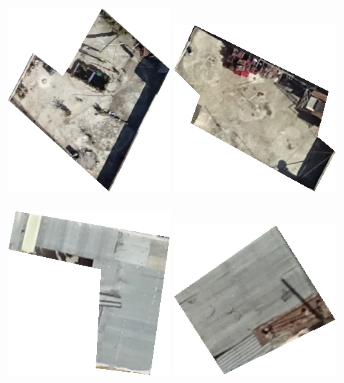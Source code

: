 \documentclass[11pt]{article}
\begin{document}
	\begin{figure}
		
		\centering
		\begin{subfigure}[c]{0.32\textwidth}
			\includegraphics[width=0.47\textwidth]{figures/mat_examples/conc1.png}		
			\includegraphics[width=0.47\textwidth]{figures/mat_examples/conc2.png}
		\end{subfigure}
		\begin{subfigure}[c]{0.32\textwidth}
			\includegraphics[width=0.47\textwidth]{figures/mat_examples/hm1.png}		
			\includegraphics[width=0.47\textwidth]{figures/mat_examples/hm2.png}

\end{subfigure}
\end{figure}
\end{document}
